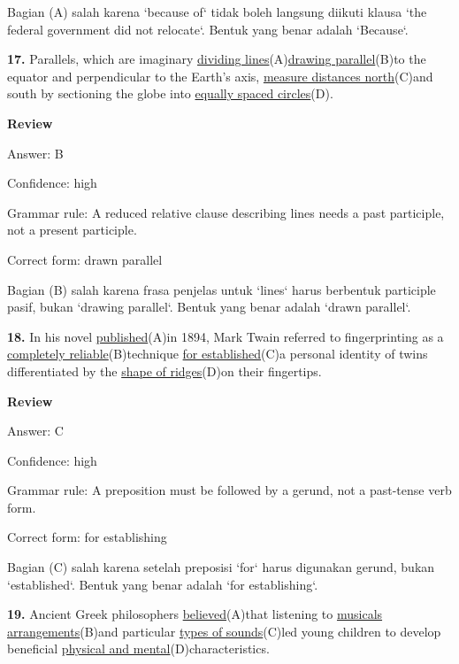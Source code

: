 \documentclass[12pt]{article}
\begin{document}
Bagian (A) salah karena `because of` tidak boleh langsung diikuti klausa `the federal government did not relocate`. Bentuk yang benar adalah `Because`.\par
\endgroup
\par
\vspace{\questionblockgap}
\noindent\textbf{17.} Parallels, which are imaginary \uline{dividing lines}(A)\uline{drawing parallel}(B)to the equator and perpendicular to the Earth's axis, \uline{measure distances north}(C)and south by sectioning the globe into \uline{equally spaced circles}(D).
\par
\begingroup
\setlength{\parskip}{0pt}
\setlength{\parindent}{0pt}
\textbf{Review}\par
Answer: B\par
Confidence: high\par
Grammar rule: A reduced relative clause describing lines needs a past participle, not a present participle.\par
Correct form: drawn parallel\par
Bagian (B) salah karena frasa penjelas untuk `lines` harus berbentuk participle pasif, bukan `drawing parallel`. Bentuk yang benar adalah `drawn parallel`.\par
\endgroup
\par
\vspace{\questionblockgap}
\noindent\textbf{18.} In his novel \uline{published}(A)in 1894, Mark Twain referred to fingerprinting as a \uline{completely reliable}(B)technique \uline{for established}(C)a personal identity of twins differentiated by the \uline{shape of ridges}(D)on their fingertips.
\par
\begingroup
\setlength{\parskip}{0pt}
\setlength{\parindent}{0pt}
\textbf{Review}\par
Answer: C\par
Confidence: high\par
Grammar rule: A preposition must be followed by a gerund, not a past-tense verb form.\par
Correct form: for establishing\par
Bagian (C) salah karena setelah preposisi `for` harus digunakan gerund, bukan `established`. Bentuk yang benar adalah `for establishing`.\par
\endgroup
\par
\vspace{\questionblockgap}
\noindent\textbf{19.} Ancient Greek philosophers \uline{believed}(A)that listening to \uline{musicals arrangements}(B)and particular \uline{types of sounds}(C)led young children to develop beneficial \uline{physical and mental}(D)characteristics.
\end{document}
